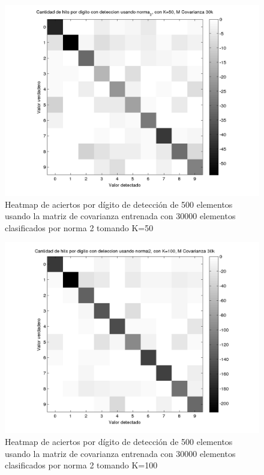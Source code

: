 \begin{figure}[H]
\includegraphics[width=\hmwidth]{plots/heatmap-30kcv-k50-norma_2.png}
\caption{Heatmap de aciertos por d\'igito de detecci\'on de 500 elementos usando la matriz de covarianza entrenada con 30000 elementos
clasificados por norma 2 tomando K=50 }
\label{fig:HM30kcv-k50}
\end{figure}

\begin{figure}[H]
\includegraphics[width=\hmwidth]{plots/heatmap-30kcv-k100-norma_2.png}
\caption{Heatmap de aciertos por d\'igito de detecci\'on de 500 elementos usando la matriz de covarianza entrenada con 30000 elementos
clasificados por norma 2 tomando K=100 }
\label{fig:HM30kcv-k100}
\end{figure}